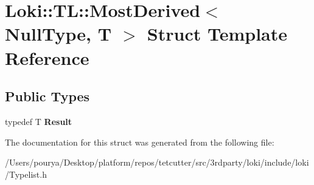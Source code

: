 \hypertarget{structLoki_1_1TL_1_1MostDerived_3_01NullType_00_01T_01_4}{}\section{Loki\+:\+:T\+L\+:\+:Most\+Derived$<$ Null\+Type, T $>$ Struct Template Reference}
\label{structLoki_1_1TL_1_1MostDerived_3_01NullType_00_01T_01_4}
\subsection*{Public Types}
\begin{DoxyCompactItemize}
\item 
\hypertarget{structLoki_1_1TL_1_1MostDerived_3_01NullType_00_01T_01_4_a6fe6544ee3e1db3b2163ce3af65fbb6c}{}typedef T {\bfseries Result}\label{structLoki_1_1TL_1_1MostDerived_3_01NullType_00_01T_01_4_a6fe6544ee3e1db3b2163ce3af65fbb6c}

\end{DoxyCompactItemize}


The documentation for this struct was generated from the following file\+:\begin{DoxyCompactItemize}
\item 
/\+Users/pourya/\+Desktop/platform/repos/tetcutter/src/3rdparty/loki/include/loki/Typelist.\+h\end{DoxyCompactItemize}
